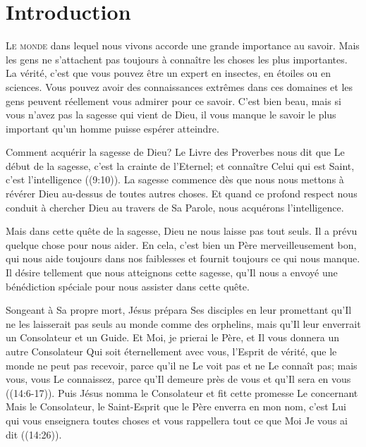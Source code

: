 
\chapter{Introduction}


\lettrine{L}{e monde} dans lequel nous vivons accorde une grande
 importance au savoir. Mais les gens ne s'attachent pas toujours
 à connaître les choses les plus importantes.
 La vérité, c'est que vous pouvez être un expert en insectes,
 en étoiles ou en sciences. Vous pouvez avoir des connaissances extrêmes
 dans ces domaines et les gens peuvent réellement vous admirer pour ce savoir.
 C'est bien beau, mais si vous n'avez pas la sagesse qui vient de Dieu,
 il vous manque le savoir le plus important qu'un homme puisse espérer atteindre.

Comment acquérir la sagesse de Dieu? Le Livre des Proverbes nous dit que
 \Og Le début de la sagesse, c'est la crainte de l'Eternel;
 et connaître Celui qui est Saint, c'est l'intelligence \Fg{}
 ((9:10)).
 La sagesse commence dès que nous nous mettons à révérer Dieu au-dessus
 de toutes autres choses. Et quand ce profond respect nous conduit
 à chercher Dieu au travers de Sa Parole, nous acquérons l'intelligence.

Mais dans cette quête de la sagesse, Dieu ne nous laisse pas tout seuls.
 Il a prévu quelque chose pour nous aider. En cela, c'est bien un Père
 merveilleusement bon, qui nous aide toujours dans nos faiblesses et fournit
 toujours ce qui nous manque. Il désire tellement que nous atteignons cette
 sagesse, qu'Il nous a envoyé une bénédiction spéciale pour nous assister
 dans cette quête. 

Songeant à Sa propre mort, Jésus prépara Ses disciples en leur promettant
 qu'Il ne les laisserait pas seuls au monde comme des orphelins,
 mais qu'Il leur enverrait un Consolateur et un Guide.
 \Og Et Moi, je prierai le Père, et Il vous donnera un autre Consolateur
 Qui soit éternellement avec vous, l'Esprit de vérité, que le monde
 ne peut pas recevoir, parce qu'il ne Le voit pas et ne Le connaît pas;
 mais vous, vous Le connaissez, parce qu'Il demeure près de vous
 et qu'Il sera en vous \Fg{} ((14:6-17)).
 Puis Jésus nomma le Consolateur et fit cette promesse Le concernant\frcolon{}
 \Og Mais le Consolateur, le Saint-Esprit que le Père enverra en mon nom,
 c'est Lui qui vous enseignera toutes choses et vous rappellera tout ce que
 Moi Je vous ai dit \Fg{} ((14:26)).


